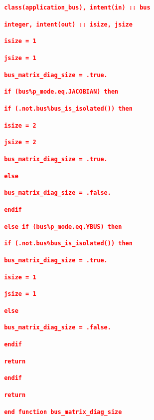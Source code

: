 \documentclass[12pt]{report} %
\begin{document}
\textcolor{red}{\texttt{\textbf{    class(application\_bus), intent(in) :: bus}}}

\textcolor{red}{\texttt{\textbf{    integer, intent(out) :: isize, jsize}}}

\textcolor{red}{\texttt{\textbf{    isize = 1}}}

\textcolor{red}{\texttt{\textbf{    jsize = 1}}}

\textcolor{red}{\texttt{\textbf{    bus\_matrix\_diag\_size = .true.}}}

\textcolor{red}{\texttt{\textbf{    if (bus\%p\_mode.eq.JACOBIAN) then}}}

\textcolor{red}{\texttt{\textbf{      if (.not.bus\%bus\_is\_isolated()) then}}}

\textcolor{red}{\texttt{\textbf{        isize = 2}}}

\textcolor{red}{\texttt{\textbf{        jsize = 2}}}

\textcolor{red}{\texttt{\textbf{        bus\_matrix\_diag\_size = .true.}}}

\textcolor{red}{\texttt{\textbf{      else}}}

\textcolor{red}{\texttt{\textbf{        bus\_matrix\_diag\_size = .false.}}}

\textcolor{red}{\texttt{\textbf{      endif}}}

\textcolor{red}{\texttt{\textbf{    else if (bus\%p\_mode.eq.YBUS) then}}}

\textcolor{red}{\texttt{\textbf{      if (.not.bus\%bus\_is\_isolated()) then}}}

\textcolor{red}{\texttt{\textbf{        bus\_matrix\_diag\_size = .true.}}}

\textcolor{red}{\texttt{\textbf{        isize = 1}}}

\textcolor{red}{\texttt{\textbf{        jsize = 1}}}

\textcolor{red}{\texttt{\textbf{      else}}}

\textcolor{red}{\texttt{\textbf{        bus\_matrix\_diag\_size = .false.}}}

\textcolor{red}{\texttt{\textbf{      endif}}}

\textcolor{red}{\texttt{\textbf{      return}}}

\textcolor{red}{\texttt{\textbf{    endif}}}

\textcolor{red}{\texttt{\textbf{    return}}}

\textcolor{red}{\texttt{\textbf{  end function bus\_matrix\_diag\_size}}}
\end{document}
